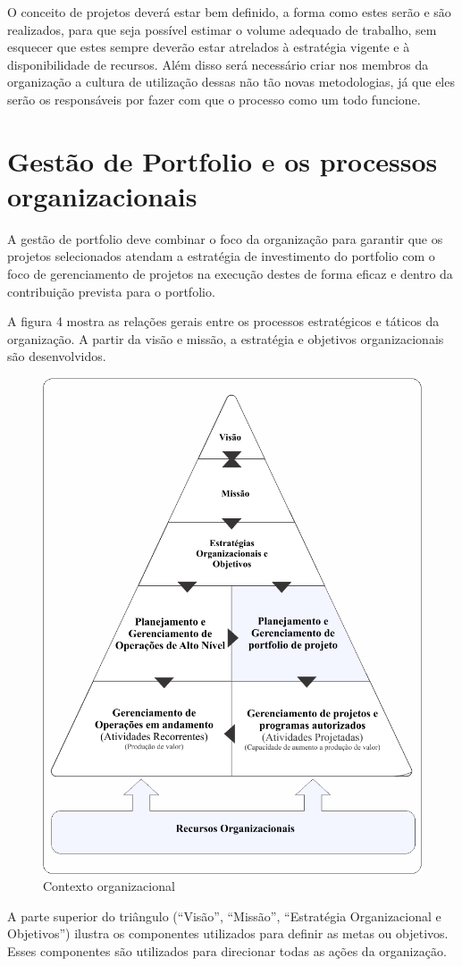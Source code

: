 \documentclass[12pt,a4paper,ruledheader,tocpage=prefix,floatnumber=continuous,pagestart=folhaderosto,font=times]{abnt}
\begin{document}
O conceito de projetos deverá estar bem definido, a forma como estes serão e são realizados, para que seja possível estimar o volume adequado de trabalho,
sem esquecer que estes sempre deverão estar atrelados à estratégia vigente e à disponibilidade de recursos. Além disso será necessário criar nos membros 
da organização a cultura de utilização dessas não tão novas metodologias, já que eles serão os responsáveis por fazer com que o processo como um todo 
funcione.

\section{Gestão de Portfolio e os processos organizacionais}
A gestão de portfolio deve combinar o foco da organização para garantir que os projetos selecionados atendam a estratégia de investimento do 
portfolio com o foco de gerenciamento de projetos na execução destes de forma eficaz e dentro da contribuição prevista para o portfolio.

A figura 4 mostra as relações gerais entre os processos estratégicos e táticos da organização. A partir da visão e missão, a estratégia e 
objetivos organizacionais são desenvolvidos.

\begin{figure}[H]
\centering
\includegraphics[width=.6\textwidth]{img/fig4.png}
\caption{Contexto organizacional}
\end{figure}

A parte superior do triângulo (``Visão'', ``Missão'', ``Estratégia Organizacional e Objetivos'') ilustra os componentes utilizados para definir  as metas 
ou objetivos. Esses componentes são utilizados para direcionar todas as ações da organização. 
\end{document}
